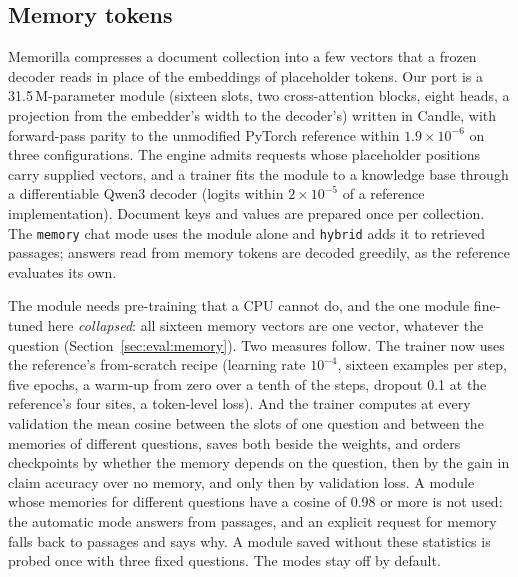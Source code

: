 \subsection{Memory tokens}
\label{sec:mem:tokens}
Memorilla \cite{memorilla2026} compresses a document collection into a few
vectors that a frozen decoder reads in place of the embeddings of placeholder
tokens. Our port is a 31.5\,M-parameter module (sixteen slots, two
cross-attention blocks, eight heads, a projection from the embedder's width
to the decoder's) written in Candle, with forward-pass parity to the
unmodified PyTorch reference within $1.9\times10^{-6}$ on three
configurations. The engine admits requests whose placeholder positions carry
supplied vectors, and a trainer fits the module to a knowledge base through a
differentiable Qwen3 decoder (logits within $2\times10^{-5}$ of a reference
implementation). Document keys and values are prepared once per collection. The
\texttt{memory} chat mode uses the module alone and \texttt{hybrid} adds it to
retrieved passages; answers read from memory tokens are decoded greedily, as
the reference evaluates its own.

The module needs pre-training that a CPU cannot do, and the one module
fine-tuned here \emph{collapsed}: all sixteen memory vectors are one vector,
whatever the question (Section~\ref{sec:eval:memory}). Two measures follow.
The trainer now uses the reference's from-scratch recipe (learning rate
$10^{-4}$, sixteen examples per step, five epochs, a warm-up from zero over a
tenth of the steps, dropout 0.1 at the reference's four sites, a token-level
loss). And the trainer computes at every validation the mean cosine between
the slots of one question and between the memories of different questions,
saves both beside the weights, and orders checkpoints by whether the memory
depends on the question, then by the gain in claim accuracy over no memory,
and only then by validation loss. A module whose
memories for different questions have a cosine of 0.98 or more is not used:
the automatic mode answers from passages, and an explicit request for memory
falls back to passages and says why. A module saved without these statistics
is probed once with three fixed questions. The modes stay off by default.
